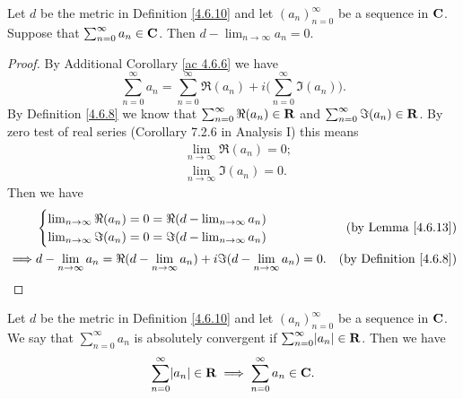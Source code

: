 \begin{additional corollary}\label{ac 4.6.7}
Let \(d\) be the metric in Definition \ref{4.6.10} and let \((a_n)_{n = 0}^\infty\) be a sequence in \(\mathbf{C}\).
Suppose that \(\sum_{n = 0}^\infty a_n \in \mathbf{C}\).
Then \(d - \lim_{n \to \infty} a_n = 0\).
\end{additional corollary}

\begin{proof}
    By Additional Corollary \ref{ac 4.6.6} we have
    \[
        \sum_{n = 0}^\infty a_n = \sum_{n = 0}^\infty \Re(a_n) + i \bigg(\sum_{n = 0}^\infty \Im(a_n)\bigg).
    \]
    By Definition \ref{4.6.8} we know that \(\sum_{n = 0}^\infty \Re(a_n) \in \mathbf{R}\) and \(\sum_{n = 0}^\infty \Im(a_n) \in \mathbf{R}\).
    By zero test of real series (Corollary 7.2.6 in Analysis I) this means
    \begin{align*}
         & \lim_{n \to \infty} \Re(a_n) = 0; \\
         & \lim_{n \to \infty} \Im(a_n) = 0.
    \end{align*}
    Then we have
    \begin{align*}
                 & \begin{cases}
                       \lim_{n \to \infty} \Re(a_n) = 0 = \Re(d - \lim_{n \to \infty} a_n) \\
                       \lim_{n \to \infty} \Im(a_n) = 0 = \Im(d - \lim_{n \to \infty} a_n)
                   \end{cases}                                   & \text{(by Lemma \ref{4.6.13})}                                                                \\
        \implies & d - \lim_{n \to \infty} a_n = \Re(d - \lim_{n \to \infty} a_n) + i \Im(d - \lim_{n \to \infty} a_n) = 0. & \text{(by Definition \ref{4.6.8})}
    \end{align*}
\end{proof}

\begin{additional corollary}\label{ac 4.6.8}
Let \(d\) be the metric in Definition \ref{4.6.10} and let \((a_n)_{n = 0}^\infty\) be a sequence in \(\mathbf{C}\).
We say that \(\sum_{n = 0}^\infty a_n\) is absolutely convergent if \(\sum_{n = 0}^\infty \abs{a_n} \in \R\).
Then we have
\[
    \sum_{n = 0}^\infty \abs{a_n} \in \R \implies \sum_{n = 0}^\infty a_n \in \C.
\]
\end{additional corollary}

